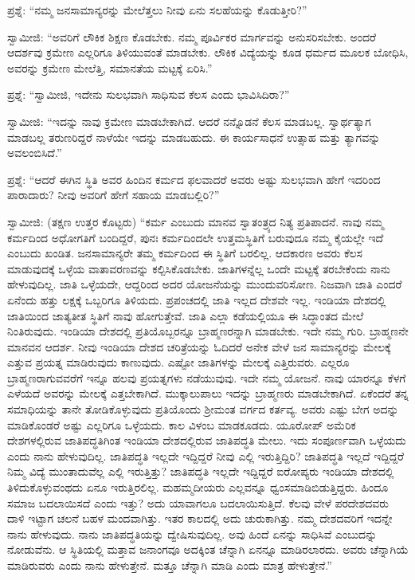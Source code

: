 ಪ್ರಶ್ನೆ: “ನಮ್ಮ ಜನಸಾಮಾನ್ಯರನ್ನು ಮೇಲೆತ್ತಲು ನೀವು ಏನು ಸಲಹೆಯನ್ನು ಕೊಡುತ್ತೀರಿ?”

ಸ್ವಾಮೀಜಿ: “ಅವರಿಗೆ ಲೌಕಿಕ ಶಿಕ್ಷಣ ಕೊಡಬೇಕು. ನಮ್ಮ ಪೂರ್ವಿಕರ ಮಾರ್ಗವನ್ನು ಅನುಸರಿಸಬೇಕು. ಅಂದರೆ ಆದರ್ಶವು ಕ್ರಮೇಣ ಎಲ್ಲರಿಗೂ ತಿಳಿಯುವಂತೆ ಮಾಡಬೇಕು. ಲೌಕಿಕ ವಿದ್ಯೆಯನ್ನು ಕೂಡ ಧರ್ಮದ ಮೂಲಕ ಬೋಧಿಸಿ, ಅವರನ್ನು ಕ್ರಮೇಣ ಮೇಲೆತ್ತಿ, ಸಮಾನತೆಯ ಮಟ್ಟಕ್ಕೆ ಏರಿಸಿ.”

ಪ್ರಶ್ನೆ: “ಸ್ವಾಮೀಜಿ, ಇದೇನು ಸುಲಭವಾಗಿ ಸಾಧಿಸುವ ಕೆಲಸ ಎಂದು ಭಾವಿಸಿದಿರಾ?”

ಸ್ವಾಮೀಜಿ: “ಇದನ್ನು ನಾವು ಕ್ರಮೇಣ ಮಾಡಬೇಕಾಗಿದೆ. ಆದರೆ ನನ್ನೊಡನೆ ಕೆಲಸ ಮಾಡಬಲ್ಲ. ಸ್ವಾರ್ಥತ್ಯಾಗ ಮಾಡಬಲ್ಲ ತರುಣರಿದ್ದರೆ ನಾಳೆಯೇ ಇದನ್ನು ಮಾಡಬಹುದು. ಈ ಕಾರ್ಯಸಾಧನೆ ಉತ್ಸಾಹ ಮತ್ತು ತ್ಯಾಗವನ್ನು ಅವಲಂಬಿಸಿದೆ.”

ಪ್ರಶ್ನೆ: “ಆದರೆ ಈಗಿನ ಸ್ಥಿತಿ ಅವರ ಹಿಂದಿನ ಕರ್ಮದ ಫಲವಾದರೆ ಅವರು ಅಷ್ಟು ಸುಲಭವಾಗಿ ಹೇಗೆ ಇದರಿಂದ ಪಾರಾದಾರು? ನೀವು ಅವರಿಗೆ ಹೇಗೆ ಸಹಾಯ ಮಾಡಬಲ್ಲಿರಿ?”

ಸ್ವಾಮೀಜಿ: (ತಕ್ಷಣ ಉತ್ತರ ಕೊಟ್ಟರು) “ಕರ್ಮ ಎಂಬುದು ಮಾನವ ಸ್ವಾತಂತ್ರ್ಯದ ನಿತ್ಯ ಪ್ರತಿಪಾದನೆ. ನಾವು ನಮ್ಮ ಕರ್ಮದಿಂದ ಅಧೋಗತಿಗೆ ಬಂದಿದ್ದರೆ, ಪುನಃ ಕರ್ಮದಿಂದಲೇ ಉತ್ತಮಸ್ಥಿತಿಗೆ ಬರುವುದೂ ನಮ್ಮ ಕೈಯಲ್ಲೇ ಇದೆ ಎಂಬುದು ಖಂಡಿತ. ಜನಸಾಮಾನ್ಯರೇ ತಮ್ಮ ಕರ್ಮದಿಂದ ಈ ಸ್ಥಿತಿಗೆ ಬರಲಿಲ್ಲ. ಆದಕಾರಣ ಅವರು ಕೆಲಸ ಮಾಡುವುದಕ್ಕೆ ಒಳ್ಳೆಯ ವಾತಾವರಣವನ್ನು ಕಲ್ಪಿಸಿಕೊಡಬೇಕು. ಜಾತಿಗಳನ್ನೆಲ್ಲ ಒಂದೇ ಮಟ್ಟಕ್ಕೆ ತರಬೇಕೆಂದು ನಾನು ಹೇಳುವುದಿಲ್ಲ. ಜಾತಿ ಒಳ್ಳೆಯದೇ, ಆದ್ದರಿಂದ ಅದರ ಯೋಜನೆಯನ್ನು ಮುಂದುವರಿಸೋಣ. ನಿಜವಾಗಿ ಜಾತಿ ಎಂದರೆ ಏನೆಂದು ಹತ್ತು ಲಕ್ಷಕ್ಕೆ ಒಬ್ಬರಿಗೂ ತಿಳಿಯದು. ಪ್ರಪಂಚದಲ್ಲಿ ಜಾತಿ ಇಲ್ಲದ ದೇಶವೇ ಇಲ್ಲ. ಇಂಡಿಯಾ ದೇಶದಲ್ಲಿ ಜಾತಿಯಿಂದ ಜಾತ್ಯತೀತ ಸ್ಥಿತಿಗೆ ನಾವು ಹೋಗುತ್ತೇವೆ. ಜಾತಿ ಎಲ್ಲಾ ಕಡೆಯಲ್ಲಿಯೂ ಈ ಸಿದ್ಧಾಂತದ ಮೇಲೆ ನಿಂತಿರುವುದು. ಇಂಡಿಯಾ ದೇಶದಲ್ಲಿ ಪ್ರತಿಯೊಬ್ಬರನ್ನೂ ಬ್ರಾಹ್ಮಣರನ್ನಾಗಿ ಮಾಡಬೇಕು. ಇದೇ ನಮ್ಮ ಗುರಿ. ಬ್ರಾಹ್ಮಣನೇ ಮಾನವನ ಆದರ್ಶ. ನೀವು ಇಂಡಿಯಾ ದೇಶದ ಚರಿತ್ರೆಯನ್ನು ಓದಿದರೆ ಅನೇಕ ವೇಳೆ ಜನ ಸಾಮಾನ್ಯರನ್ನು ಮೇಲಕ್ಕೆ ಎತ್ತುವ ಪ್ರಯತ್ನ ಮಾಡಿರುವುದು ಕಾಣುವುದು. ಎಷ್ಟೋ ಜಾತಿಗಳನ್ನು ಮೇಲಕ್ಕೆ ಎತ್ತಿರುವರು. ಎಲ್ಲರೂ ಬ್ರಾಹ್ಮಣರಾಗುವವರೆಗೆ ಇನ್ನೂ ಹಲವು ಪ್ರಯತ್ನಗಳು ನಡೆಯುವುವು. ಇದೇ ನಮ್ಮ ಯೋಜನೆ. ನಾವು ಯಾರನ್ನೂ ಕೆಳಗೆ ಎಳೆಯದೆ ಅವರನ್ನು ಮೇಲಕ್ಕೆ ಎತ್ತಬೇಕಾಗಿದೆ. ಮುಕ್ಕಾಲುಪಾಲು ಇದನ್ನು ಬ್ರಾಹ್ಮಣರು ಮಾಡಬೇಕಾಗಿದೆ. ಏಕೆಂದರೆ ತನ್ನ ಸಮಾಧಿಯನ್ನು ತಾನೇ ತೋಡಿಕೊಳ್ಳುವುದು ಪ್ರತಿಯೊಂದು ಶ‍್ರೀಮಂತ ವರ್ಗದ ಕರ್ತವ್ಯ. ಅವರು ಎಷ್ಟು ಬೇಗ ಅದನ್ನು ಮಾಡಿಕೊಂಡರೆ ಅಷ್ಟು ಎಲ್ಲರಿಗೂ ಒಳ್ಳೆಯದು. ಕಾಲ ವಿಳಂಬ ಮಾಡಕೂಡದು. ಯೂರೋಪ್​ ಅಮೆರಿಕ ದೇಶಗಳಲ್ಲಿರುವ ಜಾತಿಪದ್ಧತಿಗಿಂತ ಇಂಡಿಯಾ ದೇಶದಲ್ಲಿರುವ ಜಾತಿಪದ್ಧತಿ ಮೇಲು. ಇದು ಸಂಪೂರ್ಣವಾಗಿ ಒಳ್ಳೆಯದು ಎಂದು ನಾನು ಹೇಳುವುದಿಲ್ಲ. ಜಾತಿಪದ್ಧತಿ ಇಲ್ಲದೇ ಇದ್ದಿದ್ದರೆ ನೀವು ಎಲ್ಲಿ ಇರುತ್ತಿದ್ದಿರಿ? ಜಾತಿಪದ್ಧತಿ ಇಲ್ಲದೆ ಇದ್ದಿದ್ದರೆ ನಿಮ್ಮ ವಿದ್ಯೆ ಮುಂತಾದುವೆಲ್ಲ ಎಲ್ಲಿ ಇರುತ್ತಿತ್ತು? ಜಾತಿಪದ್ಧತಿ ಇಲ್ಲದೇ ಇದ್ದಿದ್ದರೆ ಐರೋಪ್ಯರು ಇಂಡಿಯಾ ದೇಶದಲ್ಲಿ ತಿಳಿದುಕೊಳ್ಳುವಂಥದು ಏನೂ ಇರುತ್ತಿರಲಿಲ್ಲ. ಮಹಮ್ಮದೀಯರು ಎಲ್ಲವನ್ನೂ ಧ್ವಂಸಮಾಡಿಬಿಡುತ್ತಿದ್ದರು. ಹಿಂದೂ ಸಮಾಜ ಬದಲಾಯಿಸದೆ ಎಂದು ಇತ್ತು? ಅದು ಯಾವಾಗಲೂ ಬದಲಾಯಿಸುತ್ತಿದೆ. ಕೆಲವು ವೇಳೆ ಪರದೇಶದವರು ದಾಳಿ ಇಟ್ಟಾಗ ಚಲನೆ ಬಹಳ ಮಂದವಾಗಿತ್ತು. ಇತರ ಕಾಲದಲ್ಲಿ ಅದು ಚುರುಕಾಗಿತ್ತು. ನಮ್ಮ ದೇಶದವರಿಗೆ ಇದನ್ನೇ ನಾನು ಹೇಳುವುದು. ನಾನು ಜಾತಿಪದ್ಧತಿಯನ್ನು ದ್ವೇಷಿಸುವುದಿಲ್ಲ. ಅವು ಹಿಂದೆ ಏನನ್ನು ಸಾಧಿಸಿವೆ ಎಂಬುದನ್ನು ನೋಡುವೆನು. ಆ ಸ್ಥಿತಿಯಲ್ಲಿ ಮತ್ತಾವ ಜನಾಂಗವೂ ಅದಕ್ಕಿಂತ ಚೆನ್ನಾಗಿ ಏನನ್ನೂ ಮಾಡಿರಲಾರದು. ಅವರು ಚೆನ್ನಾಗಿಯೆ ಮಾಡಿರುವರು ಎಂದು ನಾನು ಹೇಳುತ್ತೇನೆ. ಮತ್ತೂ ಚೆನ್ನಾಗಿ ಮಾಡಿ ಎಂದು ಮಾತ್ರ ಹೇಳುತ್ತೇನೆ.”

